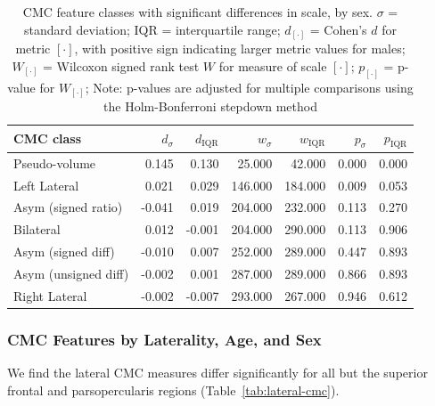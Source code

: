 \documentclass{article}
\begin{document}
\begin{table}
\centering
\begin{tabular}{lrrrrrr}
	\toprule
	CMC class & \(d_{\sigma}\) & \(d_\text{IQR}\)  & \(w_{\sigma}\) & \(w_\text{IQR}\)   & \(p_{\sigma}\)   & \(p_\text{IQR}\) \\
	\midrule
	Pseudo-volume        &  0.145 &  0.130 &  25.000 &  42.000 & 0.000 & 0.000 \\
	Left Lateral         &  0.021 &  0.029 & 146.000 & 184.000 & 0.009 & 0.053 \\
	Asym (signed ratio)  & -0.041 &  0.019 & 204.000 & 232.000 & 0.113 & 0.270 \\
	Bilateral            &  0.012 & -0.001 & 204.000 & 290.000 & 0.113 & 0.906 \\
	Asym (signed diff)   & -0.010 &  0.007 & 252.000 & 289.000 & 0.447 & 0.893 \\
	Asym (unsigned diff) & -0.002 &  0.001 & 287.000 & 289.000 & 0.866 & 0.893 \\
	Right Lateral        & -0.002 & -0.007 & 293.000 & 267.000 & 0.946 & 0.612 \\
	\bottomrule
\end{tabular}
\footnotesize
\caption{CMC feature classes with significant differences in scale, by sex.
\(\sigma\) = standard deviation; IQR = interquartile range;
\(d_{[\cdot]}\) = Cohen's \(d\) for metric \([\cdot]\), with positive sign indicating larger metric values for males;
\(W_{[\cdot]}\) = Wilcoxon signed rank test \(W\) for measure of scale \([\cdot]\);
\(p_{[\cdot]}\) = p-value for \(W_{[\cdot]}\);
Note: p-values are adjusted for multiple comparisons using the Holm-Bonferroni stepdown method} \label{tab:sig-cmc-scale-sex}
\normalsize
\end{table}


\subsubsection{CMC Features by Laterality, Age, and Sex}

We find the lateral CMC measures differ significantly for all but the
superior frontal and parsopercularis regions (Table~\ref{tab:lateral-cmc}).
\end{document}
